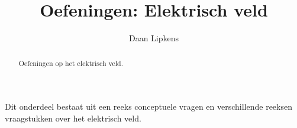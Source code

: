 \documentclass{ximera}
\title{Oefeningen: Elektrisch veld}
\author{Daan Lipkens}
\begin{document}
\begin{abstract}
    Oefeningen op het elektrisch veld.
\end{abstract}
\maketitle

Dit onderdeel bestaat uit een reeks conceptuele vragen en verschillende reeksen vraagstukken over het elektrisch veld.
\end{document}

